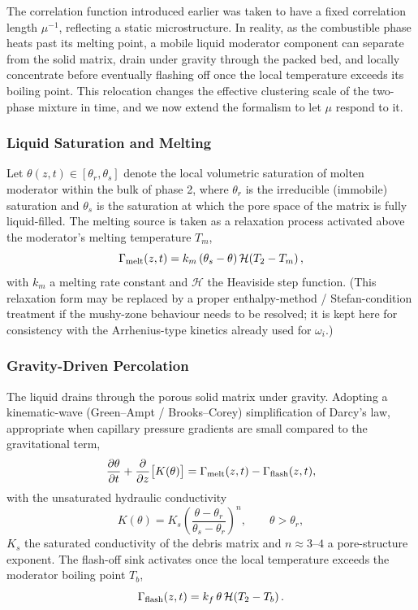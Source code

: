 \documentclass[12pt]{article}
\begin{document}
The correlation function introduced earlier was taken to have a fixed
correlation length $\mu^{-1}$, reflecting a static microstructure. In
reality, as the combustible phase heats past its melting point, a mobile
liquid moderator component can separate from the solid matrix, drain under
gravity through the packed bed, and locally concentrate before eventually
flashing off once the local temperature exceeds its boiling point. This
relocation changes the effective clustering scale of the two-phase mixture
in time, and we now extend the formalism to let $\mu$ respond to it.

\subsubsection{Liquid Saturation and Melting}

Let $\theta(z,t) \in [\theta_r, \theta_s]$ denote the local volumetric
saturation of molten moderator within the bulk of phase 2, where $\theta_r$
is the irreducible (immobile) saturation and $\theta_s$ is the saturation at
which the pore space of the matrix is fully liquid-filled. The melting
source is taken as a relaxation process activated above the moderator's
melting temperature $T_m$,
\begin{equation}
    \Gamma_{\rm melt}(z,t) = k_m\left(\theta_s - \theta\right)
        \mathcal{H}\!\left(T_2 - T_m\right),
\end{equation}
with $k_m$ a melting rate constant and $\mathcal{H}$ the Heaviside step
function. (This relaxation form may be replaced by a proper enthalpy-method
/ Stefan-condition treatment if the mushy-zone behaviour needs to be
resolved; it is kept here for consistency with the Arrhenius-type kinetics
already used for $\omega_i$.)

\subsubsection{Gravity-Driven Percolation}

The liquid drains through the porous solid matrix under gravity. Adopting a
kinematic-wave (Green--Ampt / Brooks--Corey) simplification of Darcy's law,
appropriate when capillary pressure gradients are small compared to the
gravitational term,
\begin{equation}
    \frac{\partial \theta}{\partial t}
        + \frac{\partial}{\partial z}\big[K(\theta)\big]
        = \Gamma_{\rm melt}(z,t) - \Gamma_{\rm flash}(z,t),
\end{equation}
with the unsaturated hydraulic conductivity
\begin{equation}
    K(\theta) = K_s
        \left(\frac{\theta - \theta_r}{\theta_s - \theta_r}\right)^{n},
        \qquad \theta > \theta_r,
\end{equation}
$K_s$ the saturated conductivity of the debris matrix and $n \approx 3$--$4$
a pore-structure exponent. The flash-off sink activates once the local
temperature exceeds the moderator boiling point $T_b$,
\begin{equation}
    \Gamma_{\rm flash}(z,t) = k_f\,\theta\,
        \mathcal{H}\!\left(T_2 - T_b\right).
\end{equation}
\end{document}
